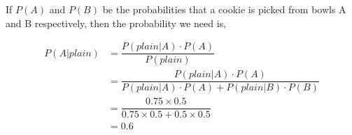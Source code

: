 \begin{solution}
	If $P(A)$ and $P(B)$ be the probabilities that a cookie is picked from bowls A and B respectively,
	then the probability we need is, 
	
	\begin{align}
		P(A \vert plain) &= \dfrac{P(plain \vert A) \cdot P(A)}{P(plain)} \\
		  &= \dfrac{P(plain \vert A) \cdot P(A)}{P(plain \vert A)\cdot P(A) + P(plain \vert B)\cdot P(B)} \\
		  &= \dfrac{0.75 \times 0.5}{0.75\times 0.5 + 0.5\times 0.5} \\
		  &= 0.6
	\end{align}

\end{solution}
